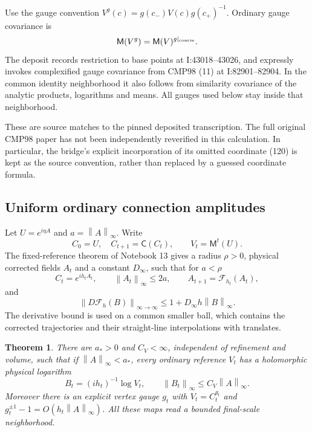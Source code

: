\documentclass[11pt]{article}
\newtheorem{theorem}{Theorem}[section]
\theoremstyle{remark}
\newcommand{\norm}[1]{\left\|#1\right\|}
\begin{document}
Use the gauge convention
$V^g(c)=g(c_-)V(c)g(c_+)^{-1}$. Ordinary gauge covariance is
\begin{equation}\label{nb-gauge-covariance}
 \mathsf M(V^g)=\mathsf M(V)^{g|_{\rm coarse}}.
\end{equation}
The deposit records restriction to base points at
I:43018--43026, and expressly invokes complexified gauge
covariance from CMP98 (11) at I:82901--82904. In the common
identity neighborhood it also follows from similarity covariance
of the analytic products, logarithms and means. All gauges used
below stay inside that neighborhood.

These are source matches to the pinned deposited transcription.
The full original CMP98 paper has not been independently
reverified in this calculation. In particular, the bridge's
explicit incorporation of its omitted coordinate (120) is kept
as the source convention, rather than replaced by a guessed
coordinate formula.

\subsection{Uniform ordinary connection amplitudes}

Let $U=e^{i\eta A}$ and $a=\norm{A}_\infty$. Write
\begin{equation}\label{nb-two-trajectories}
 C_0=U,\quad C_{t+1}=\mathsf C(C_t),\qquad
 V_t=\mathsf M^t(U).
\end{equation}
The fixed-reference theorem of Notebook 13 gives a radius
$\rho>0$, physical corrected fields $A_t$ and a constant
$D_\infty$, such that for $a<\rho$
\begin{equation}\label{nb-corrected-input}
 C_t=e^{ih_tA_t},\qquad \norm{A_t}_\infty\le2a,
 \qquad A_{t+1}=\mathcal F_{h_t}(A_t),
\end{equation}
and
\begin{equation}\label{nb-one-step-derivative}
 \norm{D\mathcal F_h(B)}_{\infty\to\infty}
             \le1+D_\infty h\norm{B}_\infty.
\end{equation}
The derivative bound is used on a common smaller ball, which
contains the corrected trajectories and their straight-line
interpolations with translates.

\begin{theorem}\label{nb-trajectory-theorem}
There are $a_*>0$ and $C_V<\infty$, independent of refinement
and volume, such that if $\norm{A}_\infty<a_*$, every ordinary
reference $V_t$ has a holomorphic physical logarithm
\begin{equation}\label{nb-ordinary-amplitude}
 B_t=(ih_t)^{-1}\log V_t,\qquad
             \norm{B_t}_\infty\le C_V\norm{A}_\infty.
\end{equation}
Moreover there is an explicit vertex gauge $g_t$ with
$V_t=C_t^{g_t}$ and $g_t^{\pm1}-1=O(h_t\norm{A}_\infty)$.
All these maps read a bounded final-scale neighborhood.
\end{theorem}
\end{document}
